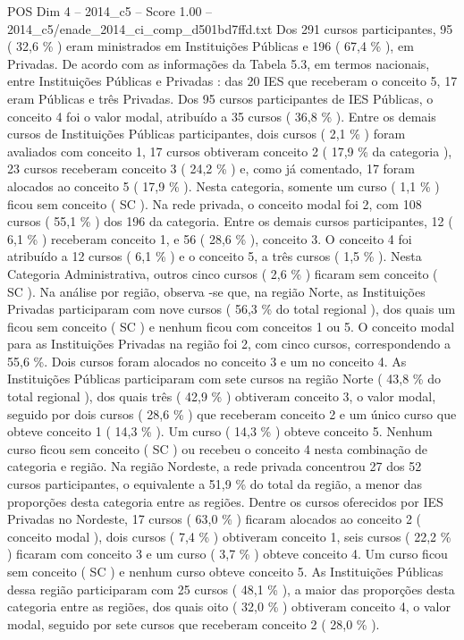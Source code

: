 \begin{textsample}{POS Dim 4 – 2014\_c5 – Score 1.00 – 2014\_c5/enade\_2014\_ci\_comp\_d501bd7ffd.txt}
Dos 291 cursos participantes, 95 ( 32,6 \% ) eram ministrados em Instituições Públicas e 196 ( 67,4 \% ), em Privadas.
De acordo com as informações da Tabela 5.3, em termos nacionais, entre Instituições Públicas e Privadas : das 20 IES que receberam o conceito 5, 17 eram Públicas e três Privadas.
Dos 95 cursos participantes de IES Públicas, o conceito 4 foi o valor modal, atribuído a 35 cursos ( 36,8 \% ).
Entre os demais cursos de Instituições Públicas participantes, dois cursos ( 2,1 \% ) foram avaliados com conceito 1, 17 cursos obtiveram conceito 2 ( 17,9 \% da categoria ), 23 cursos receberam conceito 3 ( 24,2 \% ) e, como já comentado, 17 foram alocados ao conceito 5 ( 17,9 \% ).
Nesta categoria, somente um curso ( 1,1 \% ) ficou sem conceito ( SC ).
Na rede privada, o conceito modal foi 2, com 108 cursos ( 55,1 \% ) dos 196 da categoria.
Entre os demais cursos participantes, 12 ( 6,1 \% ) receberam conceito 1, e 56 ( 28,6 \% ), conceito 3.
O conceito 4 foi atribuído a 12 cursos ( 6,1 \% ) e o conceito 5, a três cursos ( 1,5 \% ).
Nesta Categoria Administrativa, outros cinco cursos ( 2,6 \% ) ficaram sem conceito ( SC ).
Na análise por região, observa -se que, na região Norte, as Instituições Privadas participaram com nove cursos ( 56,3 \% do total regional ), dos quais um ficou sem conceito ( SC ) e nenhum ficou com conceitos 1 ou 5.
O conceito modal para as Instituições Privadas na região foi 2, com cinco cursos, correspondendo a 55,6 \%.
Dois cursos foram alocados no conceito 3 e um no conceito 4.
As Instituições Públicas participaram com sete cursos na região Norte ( 43,8 \% do total regional ), dos quais três ( 42,9 \% ) obtiveram conceito 3, o valor modal, seguido por dois cursos ( 28,6 \% ) que receberam conceito 2 e um único curso que obteve conceito 1 ( 14,3 \% ).
Um curso ( 14,3 \% ) obteve conceito 5.
Nenhum curso ficou sem conceito ( SC ) ou recebeu o conceito 4 nesta combinação de categoria e região.
Na região Nordeste, a rede privada concentrou 27 dos 52 cursos participantes, o equivalente a 51,9 \% do total da região, a menor das proporções desta categoria entre as regiões.
Dentre os cursos oferecidos por IES Privadas no Nordeste, 17 cursos ( 63,0 \% ) ficaram alocados ao conceito 2 ( conceito modal ), dois cursos ( 7,4 \% ) obtiveram conceito 1, seis cursos ( 22,2 \% ) ficaram com conceito 3 e um curso ( 3,7 \% ) obteve conceito 4.
Um curso ficou sem conceito ( SC ) e nenhum curso obteve conceito 5.
As Instituições Públicas dessa região participaram com 25 cursos ( 48,1 \% ), a maior das proporções desta categoria entre as regiões, dos quais oito ( 32,0 \% ) obtiveram conceito 4, o valor modal, seguido por sete cursos que receberam conceito 2 ( 28,0 \% ).

\end{textsample}
